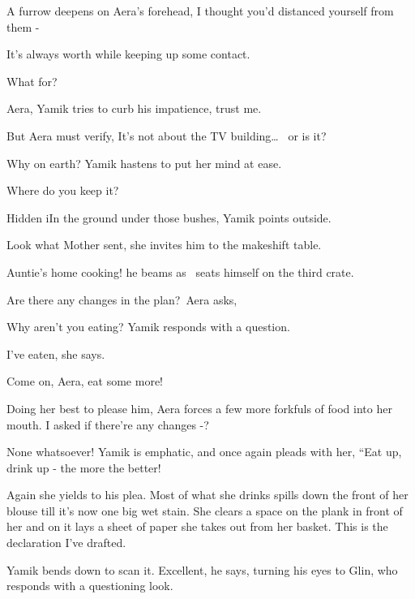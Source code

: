 \documentclass[letterpaper]{article}
\begin{document}
A furrow deepens on Aera's forehead, {\textquotedbl}I thought you'd distanced yourself from them -{\textquotedbl} 

{\textquotedbl}It's always worth while keeping up some contact.{\textquotedbl} 

{\textquotedbl}What for?{\textquotedbl} 

{\textquotedbl}Aera,{\textquotedbl} Yamik tries to curb his impatience, {\textquotedbl}trust me.{\textquotedbl} 

But Aera must verify, {\textquotedbl}It's not about the TV building{\dots} \ or is it?{\textquotedbl} 

{\textquotedbl}Why on earth?{\textquotedbl} Yamik hastens to put her mind at ease. ~

{\textquotedbl}Where do you keep it?{\textquotedbl} 

{\textquotedbl}Hidden iIn the ground under those bushes,{\textquotedbl} Yamik points outside.

{\textquotedbl}Look what Mother sent,{\textquotedbl} she invites him to the makeshift table. 

{\textquotedbl}Auntie's home cooking!{\textquotedbl} he beams as \ seats himself on the third crate. 

{\textquotedbl}Are there any changes in the plan?{\textquotedbl}~Aera asks,

{\textquotedbl}Why aren't you eating?{\textquotedbl} Yamik responds with a question. 

{\textquotedbl}I've eaten,{\textquotedbl} she says. ~

{\textquotedbl}Come on, Aera, eat some more!{\textquotedbl} \ 

Doing her best to please him, Aera forces a few more forkfuls of food into her mouth. {\textquotedbl}I asked if there're
any changes -?{\textquotedbl}

{\textquotedbl}None whatsoever!{\textquotedbl} Yamik is emphatic, and once again pleads with her, ``Eat up, drink up
-\textcolor{red}{ }the more the better!{\textquotedbl} 

Again she yields to his plea. Most of what she drinks spills down the front of her blouse till it's now one big wet
stain. She clears a space on the plank in front of her and on it lays a sheet of paper she takes out from her basket.
{\textquotedbl}This is the declaration I've drafted.{\textquotedbl}

Yamik bends down to scan it. {\textquotedbl}Excellent,{\textquotedbl} he says, turning his eyes to Glin, who responds
with a questioning look. 
\end{document}
